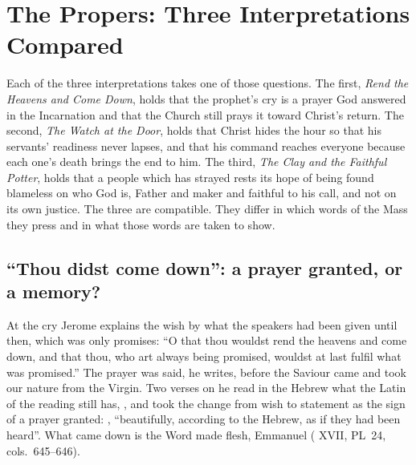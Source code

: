 
\section{The Propers: Three Interpretations Compared}

Each of the three interpretations takes one of those questions. The first,
\emph{Rend the Heavens and Come Down}, holds that the prophet's cry is a
prayer God answered in the Incarnation and that the Church still prays it
toward Christ's return. The second, \emph{The Watch at the Door}, holds that
Christ hides the hour so that his servants' readiness never lapses, and that
his command reaches everyone because each one's death brings the end to him.
The third, \emph{The Clay and the Faithful Potter}, holds that a people which
has strayed rests its hope of being found blameless on who God is, Father and
maker and faithful to his call, and not on its own justice. The three are
compatible. They differ in which words of the Mass they press and in what
those words are taken to show.

\subsection{``Thou didst come down'': a prayer granted, or a memory?}

At the cry Jerome explains the wish by what the speakers had been
given until then, which was only promises: ``O that thou wouldst rend the
heavens and come down, and that thou, who art always being promised, wouldst
at last fulfil what was promised.'' The prayer was said, he writes, before
the Saviour came and took our nature from the Virgin. Two verses on he read in
the Hebrew what the Latin of the reading still has, , and
took the change from wish to statement as the sign of a prayer granted:
, ``beautifully,
according to the Hebrew, as if they had been heard''. What came down is the
Word made flesh, Emmanuel ( XVII, PL~24,
cols.~645--646).

